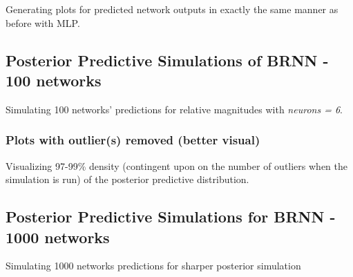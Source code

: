 \documentclass[
]{article}
\begin{document}
Generating plots for predicted network outputs in exactly the same
manner as before with MLP.

\hypertarget{posterior-predictive-simulations-of-brnn---100-networks}{%
\subsection{Posterior Predictive Simulations of BRNN - 100
networks}\label{posterior-predictive-simulations-of-brnn---100-networks}}

Simulating 100 networks' predictions for relative magnitudes with
\emph{neurons = 6}.

\hypertarget{plots-with-outliers-removed-better-visual}{%
\subsubsection{Plots with outlier(s) removed (better
visual)}\label{plots-with-outliers-removed-better-visual}}

Visualizing 97-99\% density (contingent upon on the number of outliers
when the simulation is run) of the posterior predictive distribution.

\hypertarget{posterior-predictive-simulations-for-brnn---1000-networks}{%
\subsection{Posterior Predictive Simulations for BRNN - 1000
networks}\label{posterior-predictive-simulations-for-brnn---1000-networks}}

Simulating 1000 networks predictions for sharper posterior simulation
\end{document}
